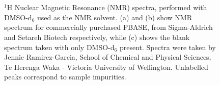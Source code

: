 \documentclass[
  a4paper,
]{scrbook}
\begin{document}
\begin{figure}[H]
\begin{minipage}[t]{0.03\linewidth}
{\centering 


}

\end{minipage}%
%
\begin{minipage}[t]{0.01\linewidth}

{\centering 

~

}

\end{minipage}%
%
\begin{minipage}[t]{0.92\linewidth}

{\centering 


}

\end{minipage}%
%
\begin{minipage}[t]{0.04\linewidth}

{\centering 

~

}

\end{minipage}%

\caption{\label{fig-pbase-nmr}\(^{1}\)H Nuclear Magnetic Resonance (NMR)
spectra, performed with DMSO-d\(_6\) used as the NMR solvent. (a) and
(b) show NMR spectrum for commercially purchased PBASE, from
Sigma-Aldrich and Setareh Biotech respectively, while (c) shows the
blank spectrum taken with only DMSO-d\(_6\) present. Spectra were taken
by Jennie Ramirez-Garcia, School of Chemical and Physical Sciences, Te
Herenga Waka - Victoria University of Wellington. Unlabelled peaks
correspond to sample impurities.}

\end{figure}
\end{document}
